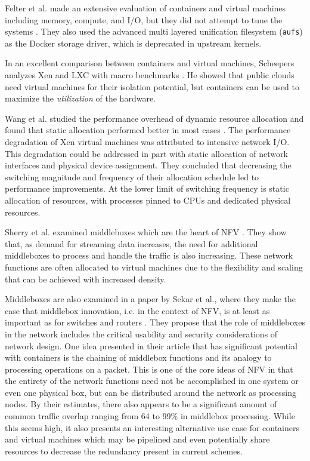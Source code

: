 Felter et al. made an extensive evaluation of containers and virtual machines including memory, compute, and I/O, but they did not attempt to tune the systems \autocite{_felter_1}.
They also used the advanced multi layered unification filesystem (\texttt{aufs}) as the Docker storage driver, which is deprecated in upstream kernels.

In an excellent comparison between containers and virtual machines, Scheepers analyzes Xen and LXC with macro benchmarks \autocite{_scheepers_1}.  
He showed that public clouds need virtual machines for their isolation potential, but containers can be used to maximize the \emph{utilization} of the hardware.

Wang et al. studied the performance overhead of dynamic resource allocation and found that static allocation performed better in most cases \autocite{wangAllocation2007}.
The performance degradation of Xen virtual machines was attributed to intensive network I/O.
This degradation could be addressed in part with static allocation of network interfaces and physical device assignment.
They concluded that decreasing the switching magnitude and frequency of their allocation schedule led to performance improvements.
At the lower limit of switching frequency is static allocation of resources, with processes pinned to CPUs and dedicated physical resources.

Sherry et al. examined middleboxes which are the heart of NFV \autocite{sherry2012making}.
They show that, as demand for streaming data increases, the need for additional middleboxes to process and handle the traffic is also increasing.
These network functions are often allocated to virtual machines due to the flexibility and scaling that can be achieved with increased density.

Middleboxes are also examined in a paper by Sekar et al., where they make the case that middlebox innovation, i.e. in the context of NFV, is at least as important as for switches and routers \autocite{sekar2011middlebox}.
They propose that the role of middleboxes in the network includes the critical usability and security considerations of network design.
One idea presented in their article that has significant potential with containers is the chaining of middlebox functions and its analogy to processing operations on a packet.  
This is one of the core ideas of NFV in that the entirety of the network functions need not be accomplished in one system or even one physical box, but can be distributed around the network as processing nodes.  
By their estimates, there also appears to be a significant amount of common traffic overlap ranging from 64 to 99\% in middlebox processing. 
While this seems high, it also presents an interesting alternative use case for containers and virtual machines which may be pipelined and even potentially share resources to decrease the redundancy present in current schemes.

